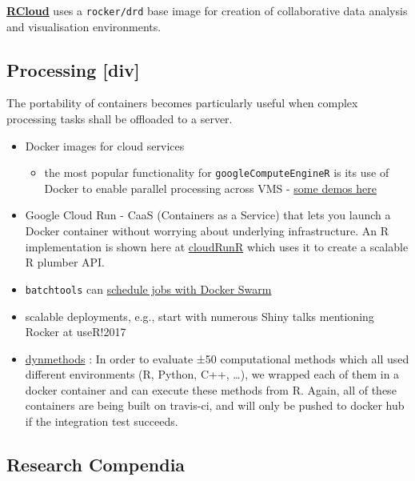 \textbf{\href{https://github.com/att/rcloud/tree/master/docker}{RCloud}}
uses a \texttt{rocker/drd} base image for creation of collaborative data
analysis and visualisation environments.

\hypertarget{processing-div}{%
\subsection{Processing {[}div{]}}\label{processing-div}}

The portability of containers becomes particularly useful when complex
processing tasks shall be offloaded to a server.

\begin{itemize}
\tightlist
\item
  Docker images for cloud services \citep{MarkEdmondson1234}

  \begin{itemize}
  \tightlist
  \item
    the most popular functionality for \texttt{googleComputeEngineR} is
    its use of Docker to enable parallel processing across VMS -
    \href{https://cloudyr.github.io/googleComputeEngineR/articles/massive-parallel.html}{some
    demos here}
  \end{itemize}
\item
  Google Cloud Run - CaaS (Containers as a Service) that lets you launch
  a Docker container without worrying about underlying infrastructure.
  An R implementation is shown here at
  \href{https://github.com/MarkEdmondson1234/cloudRunR}{cloudRunR} which
  uses it to create a scalable R plumber API.
\item
  \texttt{batchtools} \citep{Lang2017batchtools} can
  \href{https://mllg.github.io/batchtools/reference/makeClusterFunctionsDocker.html}{schedule
  jobs with Docker Swarm}
\item
  scalable deployments, e.g., start with numerous Shiny talks mentioning
  Rocker at useR!2017
\item
  \href{https://github.com/dynverse/dynmethods}{dynmethods}
  \citep{rcannood}: In order to evaluate ±50 computational methods which
  all used different environments (R, Python, C++, \ldots{}), we wrapped
  each of them in a docker container and can execute these methods from
  R. Again, all of these containers are being built on travis-ci, and
  will only be pushed to docker hub if the integration test succeeds.
\end{itemize}

\hypertarget{research-compendia-benmarwick}{%
\subsection{\texorpdfstring{Research Compendia
\citep{benmarwick}}{Research Compendia {[}@benmarwick{]}}}\label{research-compendia-benmarwick}}

